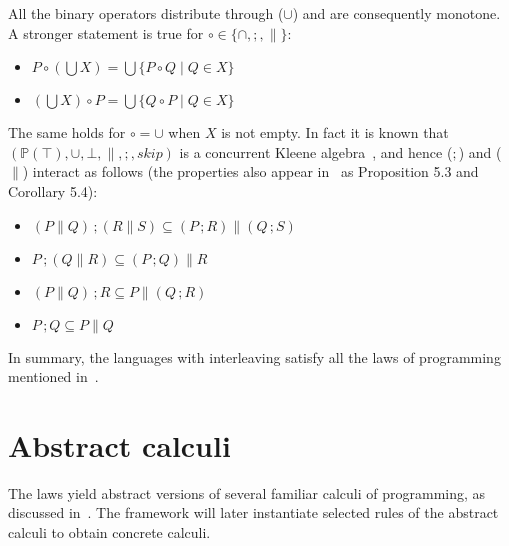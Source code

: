 \documentclass[a4paper,leqno]{llncs}
\newcommand{\aleq}{\ensuremath{\subseteq}}
\newcommand{\aeq}{\ensuremath{=}}
\newcommand{\askip}{\ensuremath{\textit{skip}}}
\newcommand{\abottom}{\ensuremath{\bot}}
\newcommand{\atopp}{\ensuremath{\top}}
\newcommand{\asemicolon}{\ensuremath{\,;}}
\newcommand{\asemicolontext}{\ensuremath{;}}
\newcommand{\aor}{\ensuremath{\cup}}
\newcommand{\aand}{\ensuremath{\cap}}
\newcommand{\aunion}{\aor}
\newcommand{\alub}{\ensuremath{\bigcup}}
\newcommand{\astar}{\ensuremath{\parallel}}
\begin{document}
All the binary operators distribute through (\aunion) and are consequently monotone. A stronger statement is true for $\circ \in \{\aand, \asemicolontext\!, \astar\}$:
\begin{itemize}
\item $P \circ (\alub{}X) \aeq \alub{}\{P \circ Q \mid Q \in X\}$
\item $(\alub{}X) \circ P \aeq \alub{}\{Q \circ P \mid Q \in X\}$
\end{itemize}
The same holds for $\circ = \aunion$ when $X$ is not empty.
In fact it is known that $(\mathbb{P}(\atopp), \aunion, \abottom, \astar, \asemicolontext\!, \askip)$ is a concurrent Kleene algebra~\cite{hoare09concurrent}, and hence (\asemicolontext) and (\astar) interact as follows (the properties also appear in~\cite{bloom96free} as Proposition 5.3 and Corollary 5.4):
\begin{itemize}
 \item $(P \astar Q)\asemicolon(R \astar S) \aleq (P \asemicolon R) \astar (Q \asemicolon S)$
 \item $P \asemicolon (Q \astar R)   \aleq   (P \asemicolon Q) \astar R$
 \item $(P \astar Q) \asemicolon R    \aleq    P \astar (Q \asemicolon R)$
 \item $P \asemicolon Q    \aleq    P \astar Q$
\end{itemize}

In summary, the languages with interleaving satisfy all the laws of programming mentioned in~\cite{hoare12laws,hoare12in,vanstaden12algebra}.

\section{Abstract calculi}\label{AbstractCalculi}
The laws yield abstract versions of several familiar calculi of programming, as discussed in~\cite{hoare09concurrent,hoare12laws,hoare12in,vanstaden12algebra}. The framework will later instantiate selected rules of the abstract calculi to obtain concrete calculi.
\end{document}
